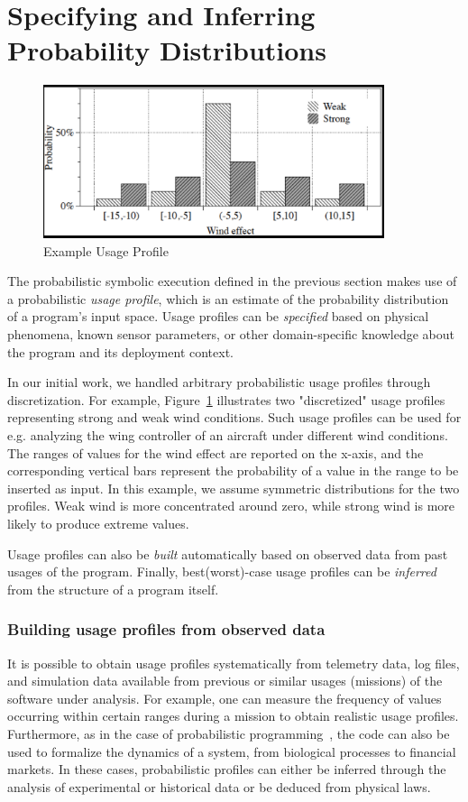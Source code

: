 \section{Specifying and Inferring Probability Distributions}
\label{sec:probspecs}

\begin{figure}
\centering
      \includegraphics[width=10cm]{up}
\caption{Example Usage Profile}
\label{fig:up}
\end{figure}


The probabilistic symbolic execution defined in the previous section
makes use of a probabilistic {\em usage profile}, which is an estimate
of the probability distribution of a program's input space.  Usage
profiles can be {\em specified} based on physical phenomena, known
sensor parameters, or other domain-specific knowledge about the program
and its deployment context.  

In our initial work, we handled arbitrary probabilistic usage profiles through discretization. For example, Figure~\ref{fig:up} illustrates two "discretized" usage profiles representing strong and weak wind conditions. Such usage profiles can be used for e.g. analyzing the wing controller of an aircraft under different wind conditions. The ranges of values for the wind effect are reported on the x-axis, and the corresponding vertical bars represent the probability of a value in the range to be inserted as input. In this example, we assume symmetric distributions for the two profiles. Weak wind is more concentrated around zero, while strong wind is more likely to produce extreme values.


Usage profiles can also be {\em built}
automatically based on observed data from past usages of the program.
Finally, best(worst)-case usage profiles can be {\em inferred} from
the structure of a program itself.  

\subsubsection{Building usage profiles from observed data}
It is possible to obtain usage profiles systematically from
telemetry data, log files, and simulation
data available from previous or similar usages (missions) of 
the software under analysis.
For example, one can measure
the frequency of values occurring within certain ranges
during a mission to obtain realistic usage profiles. 
Furthermore, as in the case of probabilistic
programming~\cite{Gordon2014}, the code can also be
used to formalize the dynamics of a system, from biological processes
to financial markets. In these cases, probabilistic profiles can 
either be inferred through the analysis of experimental or historical
data or be deduced from physical laws.


